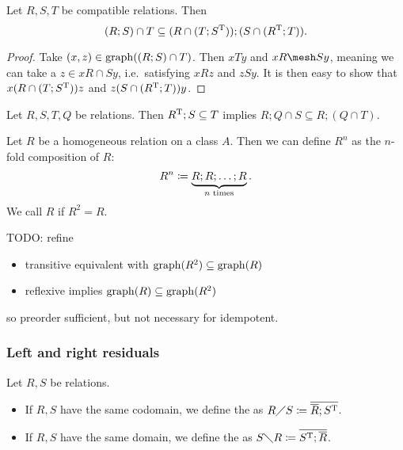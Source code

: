 \begin{proposition} \label{DedekindFormula}
Let $R,S,T$ be compatible relations. Then
\[ (R;S)\cap T \subseteq (R\cap (T; S^{\mathrm{T}}));(S\cap (R^{\mathrm{T}};T)). \]
\end{proposition}
\begin{proof}
Take $(x,z)\in \operatorname{graph}((R;S)\cap T)$. Then $xTy$ and $xR \mesh Sy$, meaning we can take a $z\in xR\cap Sy$, i.e.\ satisfying $xRz$ and $zSy$. It is then easy to show that $x(R\cap (T; S^{\mathrm{T}}))z$ and $z(S\cap (R^{\mathrm{T}};T))y$.
\end{proof}

\begin{lemma}
Let $R,S,T, Q$ be relations. Then $R^{\mathrm{T}}; S \subseteq T$ implies $R;Q\cap S \subseteq R; (Q\cap T)$.
\end{lemma}

\begin{definition}
Let $R$ be a homogeneous relation on a class $A$. Then we can define $R^n$ as the $n$-fold composition of $R$:
\[ R^n \coloneqq \underbrace{R;R; \ldots ;R}_{\text{$n$ times}}. \]
We call $R$  if $R^2 = R$.
\end{definition}

TODO: refine
\begin{proposition}
\begin{itemize}
\item transitive equivalent with $\operatorname{graph}(R^2) \subseteq \operatorname{graph}(R)$
\item reflexive implies $\operatorname{graph}(R) \subseteq \operatorname{graph}(R^2)$
\end{itemize}
\end{proposition}
so preorder sufficient, but not necessary for idempotent.

\subsubsection{Left and right residuals}
\begin{definition}
Let $R,S$ be relations.
\begin{itemize}
\item If $R,S$ have the same codomain, we define the  as $R\diagup S \coloneqq \overline{\overline{R}; S^{\mathrm{T}}}$.
\item If $R,S$ have the same domain, we define the  as $S\diagdown R \coloneqq \overline{S^{\mathrm{T}}; \overline{R}}$.
\end{itemize}
\end{definition}

